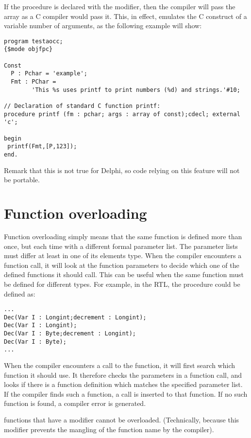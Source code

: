 If the procedure is declared with the  modifier, then the
compiler will pass the array as a C compiler would pass it. This, in effect,
emulates the C construct of a variable number of arguments, as the following
example will show:
\begin{verbatim}
program testaocc;
{$mode objfpc}

Const
  P : Pchar = 'example';
  Fmt : PChar =
        'This %s uses printf to print numbers (%d) and strings.'#10;

// Declaration of standard C function printf:
procedure printf (fm : pchar; args : array of const);cdecl; external 'c';

begin
 printf(Fmt,[P,123]);
end.
\end{verbatim}
Remark that this is not true for Delphi, so code relying on this feature
will not be portable.

\section{Function overloading}
Function overloading simply means that the same function is defined more
than once, but each time with a different formal parameter list.
The parameter lists must differ at least in one of its elements type.
When the compiler encounters a function call, it will look at the function
parameters to decide which one of the defined functions it should call.
This can be useful when the same function must be defined for different
types. For example, in the RTL, the   procedure could be
 defined as:
\begin{verbatim}
...
Dec(Var I : Longint;decrement : Longint);
Dec(Var I : Longint);
Dec(Var I : Byte;decrement : Longint);
Dec(Var I : Byte);
...
\end{verbatim}
When the compiler encounters a call to the  function, it will first search
which function it should use. It therefore checks the parameters in a
function call, and looks if there is a function definition which matches the
specified parameter list. If the compiler finds such a function, a call is
inserted to that function. If no such function is found, a compiler error is
generated.

functions that have a  modifier cannot be overloaded.
(Technically, because this modifier prevents the mangling of
the function name by the compiler).

